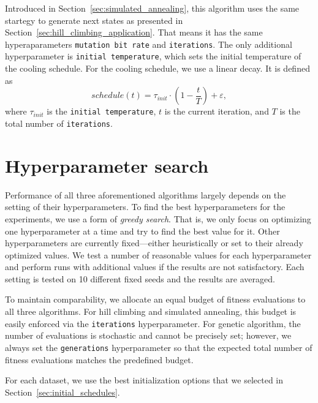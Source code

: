 Introduced in Section~\ref{sec:simulated_annealing}, this algorithm uses the same startegy to generate next states as presented in Section~\ref{sec:hill_climbing_application}. That means it has the same hyperaparameters \texttt{mutation bit rate} and \texttt{iterations}. The only additional hyperparameter is \texttt{initial temperature}, which sets the initial temperature of the cooling schedule. For the cooling schedule, we use a linear decay. It is defined as
\begin{equation}
    schedule(t) = \tau_{init} \cdot \left(1 - \frac{t}{T}\right) + \varepsilon,
\end{equation}
where $\tau_{init}$ is the \texttt{initial temperature}, $t$ is the current iteration, and $T$ is the total number of \texttt{iterations}.

\section{Hyperparameter search} \label{sec:hyperparameter_search}

Performance of all three aforementioned algorithms largely depends on the setting of their hyperparameters.
To find the best hyperparameters for the experiments, we use a form of \textit{greedy search}. That is, we only focus on optimizing one hyperparameter at a time and try to find the best value for it. Other hyperparameters are currently fixed---either heuristically or set to their already optimized values.
We test a number of reasonable values for each hyperparameter and perform runs with additional values if the results are not satisfactory.
Each setting is tested on 10 different fixed seeds and the results are averaged.

To maintain comparability, we allocate an equal budget of fitness evaluations to all three algorithms. For hill climbing and simulated annealing, this budget is easily enforced via the \texttt{iterations} hyperparameter. For genetic algorithm, the number of evaluations is stochastic and cannot be precisely set; however, we always set the \texttt{generations} hyperparameter so that the expected total number of fitness evaluations matches the predefined budget.

For each dataset, we use the best initialization options that we selected in Section~\ref{sec:initial_schedules}.

